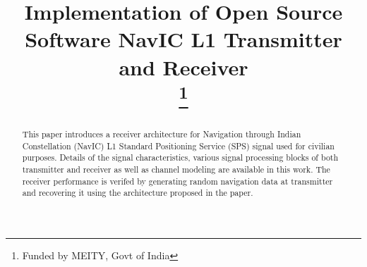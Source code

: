 \documentclass[conference]{IEEEtran}
\begin{document}
\title{Implementation of Open Source Software NavIC L1 Transmitter and Receiver\\
\thanks{Funded by MEITY, Govt of India}
}

\author{
\and
{}
\and
{}
\and
{}
\and
{}
}

\maketitle

\begin{abstract}
This paper introduces a receiver architecture
	for 	Navigation through Indian Constellation (NavIC) L1 
	Standard Positioning 
Service (SPS) signal  used for civilian purposes. 
Details of the signal characteristics, various signal processing blocks of both transmitter and receiver as well as channel modeling are available in this work. The receiver performance is verifed by 
generating random navigation data at transmitter and recovering it using the architecture proposed in the paper.
\end{abstract}
\end{document}
